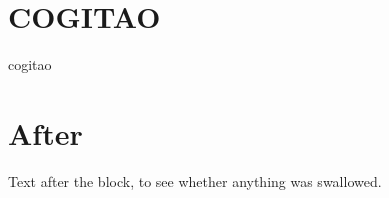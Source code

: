 \documentclass[
	fontsize=10pt, %
	twoside=true, %
	secnumdepth=3, %
	numbers=noenddot, %
]{kaobook}
\begin{document}
\appendix
\chapter{COGITAO}
\begin{importedpaper}{cogitao}
\end{importedpaper}
\chapter{After}
Text after the block, to see whether anything was swallowed.
\end{document}
